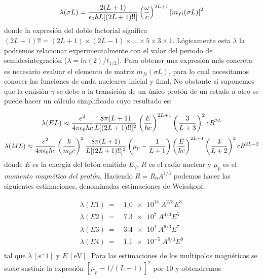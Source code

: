 \begin{equation}
	\lambda (\sigma L) = \frac{2(L+1)}{\epsilon_0 \hbar L [(2L+1)!!]} \left( \frac{\omega}{c} \right)^{2L+1} \left[ m_{fi}(\sigma L) \right]^2
\end{equation}
donde la expresión del doble factorial significa $(2L+1)!!=(2L+1)\times(2L-1) \times \ldots \times 5 \times 3 \times 1$. Lógicamente esta $\lambda$ la podremos relacionar experimentalmente con el valor del periodo de semidesintegración ($\lambda=ln(2)/t_{1/2}$). Para obtener una expresión más concreta es necesario evaluar el elemento de matriz $m_{fi}(\sigma L)$, para lo cual necesitamos conocer las funciones de onda nucleares inicial y final. No obstante si suponemos que la emisión $\gamma$ se debe a la transición de un único protón de un estado a otro se puede hacer un cálculo simplificado cuyo resultado es:

\begin{equation}	
	\lambda(EL) \approx \frac{e^2}{4\pi\epsilon_0 \hbar c} \frac{8\pi (L+1)}{L[(2L+1)!!]^2} \left( \frac{E}{\hbar c} \right)^{2L+1} \left( \frac{3}{L+3} \right)^2 cR^{2L}
\end{equation}
\begin{equation}	
	\lambda(ML) \approx \frac{e^2}{4\pi\epsilon_0 \hbar c} \left( \frac{\hbar}{m_pc} \right)^2 \frac{8\pi (L+1)}{L[(2L+1)!!]^2} \left( \mu_p - \frac{1}{L+1} \right) \left( \frac{E}{\hbar c} \right)^{2L+1} \left( \frac{3}{L+2} \right)^2 cR^{2L-2}
\end{equation}
donde $E$ es la energía del fotón emitido $E_\gamma$, $R$ es el radio nuclear y $\mu_p$ es el \textit{momento magnético del protón}. Haciendo $R=R_0 A^{1/3}$ podemos hacer las siguientes estimaciones, denominadas estimaciones de Weisskopf:

\begin{equation}
	\begin{split}
	\lambda (E1) \ = \ & \unit{\num{1.0e14} \ A^{2/3}E^3} \\
	\lambda (E2) \ = \ & \unit{\num{7.3e7} \ A^{4/3}E^5} \\
	\lambda (E3) \ = \ & \unit{\num{3.4e1} \ A^{6/3}E^7} \\
	\lambda (E4) \ = \ & \unit{\num{1.1e-5} \ A^{8/3}E^9} \\
	\end{split}
\end{equation}
tal que $\lambda \ [\unit{\s^-1}]$ y $E \ [\unit{\eV}]$. Para las estimaciones de los multipolos magnéticos se suele sustiuir la expresión $[\mu_p-1/(L+1)]^2$ por 10 y obtendremos

